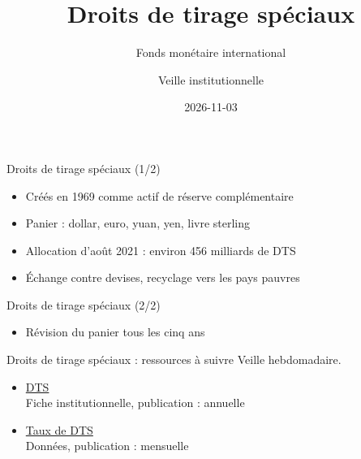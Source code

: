 \documentclass[aspectratio=169,11pt]{beamer}
\title{Droits de tirage spéciaux}
\subtitle{Fonds monétaire international}
\author{Veille institutionnelle}
\date{2026-11-03}
\begin{document}
\begin{frame}\titlepage\end{frame}

\begin{frame}{Droits de tirage spéciaux (1/2)}
\begin{itemize}
\item Créés en 1969 comme actif de réserve complémentaire
\item Panier : dollar, euro, yuan, yen, livre sterling
\item Allocation d'août 2021 : environ 456 milliards de DTS
\item Échange contre devises, recyclage vers les pays pauvres
\end{itemize}
\end{frame}

\begin{frame}{Droits de tirage spéciaux (2/2)}
\begin{itemize}
\item Révision du panier tous les cinq ans
\end{itemize}
\end{frame}

\begin{frame}{Droits de tirage spéciaux : ressources à suivre}
\small
Veille hebdomadaire.
\begin{itemize}
\item \href{https://www.imf.org/en/About/Factsheets/Sheets/2023/special-drawing-rights-sdr}{DTS}\\{\footnotesize Fiche institutionnelle, publication : annuelle}
\item \href{https://www.imf.org/external/np/fin/data/rms_sdrv.aspx}{Taux de DTS}\\{\footnotesize Données, publication : mensuelle}
\end{itemize}
\end{frame}
\end{document}
